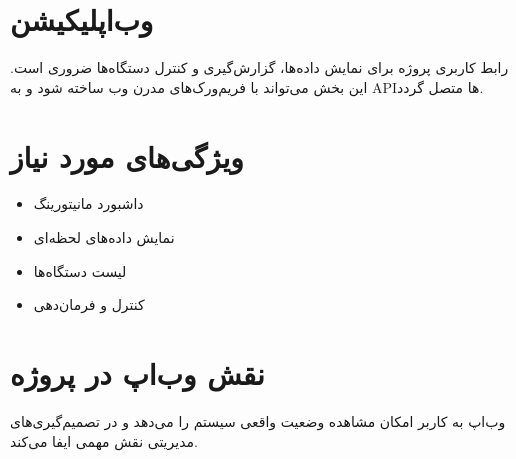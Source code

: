 \section{وب‌اپلیکیشن}

رابط کاربری پروژه برای نمایش داده‌ها، گزارش‌گیری و کنترل دستگاه‌ها ضروری است. این بخش می‌تواند با فریم‌ورک‌های مدرن وب ساخته شود و به API‌ها متصل گردد.

\section{ویژگی‌های مورد نیاز}

\begin{itemize}
    \item داشبورد مانیتورینگ
    \item نمایش داده‌های لحظه‌ای
    \item لیست دستگاه‌ها
    \item کنترل و فرمان‌دهی
\end{itemize}

\section{نقش وب‌اپ در پروژه}

وب‌اپ به کاربر امکان مشاهده وضعیت واقعی سیستم را می‌دهد و در تصمیم‌گیری‌های مدیریتی نقش مهمی ایفا می‌کند.
